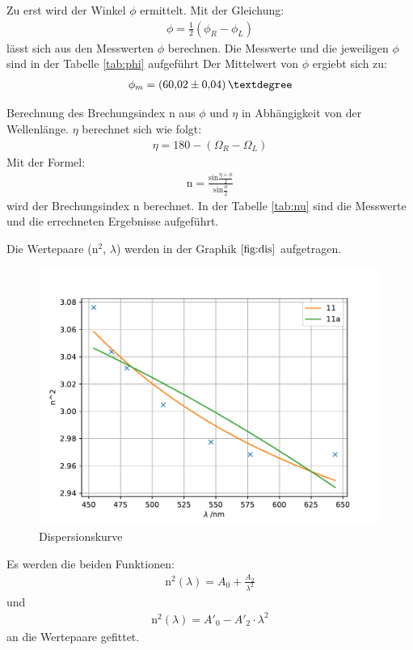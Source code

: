 Zu erst wird der Winkel $\phi$ ermittelt. Mit der Gleichung:
\begin{align*}
  \phi=\frac{1}{2}(\phi_R-\phi_L)
\end{align*}
lässt sich aus den Messwerten $\phi$ berechnen.
Die Messwerte und die jeweiligen $\phi$ sind in der Tabelle \ref{tab:phi} aufgeführt
Der Mittelwert von $\phi$ ergiebt sich zu:
\begin{align*}
  \phi_m=\SI{60,02\pm0,04}{°}
\end{align*}



Berechnung des Brechungsindex n aus $\phi$ und $\eta$ in Abhängigkeit von der Wellenlänge.
$\eta$ berechnet sich wie folgt:
\begin{align*}
  \eta=180-(\Omega_R-\Omega_L)
\end{align*}
Mit der Formel:
\begin{align*}
  \text{n}=\frac{\text{sin}\frac{\eta+\phi}{2}}{\text{sin}\frac{\phi}{2}}
\end{align*}
wird der Brechungsindex n berechnet.
In der Tabelle \ref{tab:nu} sind die Messwerte und die errechneten Ergebnisse aufgeführt.


Die Wertepaare ($\text{n}^2$, $\lambda$) werden in der Graphik $\ref{fig:dis}$ aufgetragen.
\begin{figure}
  \includegraphics{Dispersionskurve.pdf}
  \caption{Dispersionskurve}
  \label{fig:dis}
\end{figure}
Es werden die beiden Funktionen:
\begin{align}
  \text{n}^2(\lambda)=A_0+\frac{A_2}{\lambda^2}
  \label{eqn:n}
\end{align}
und
\begin{align*}
  \text{n}^2(\lambda)=A'_0-A'_2\cdot\lambda^2
\end{align*}
an die Wertepaare gefittet.

